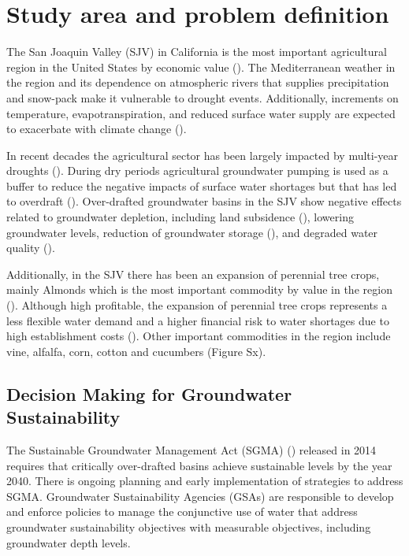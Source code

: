 \documentclass[11pt,a4paper]{article}
\begin{document}
\section{Study area and problem definition}

The San Joaquin Valley (SJV) in California is the most important agricultural region in the United States by economic value (\cite{usda_national_2020}). The Mediterranean weather in the region and its dependence on atmospheric rivers that supplies precipitation and snow-pack make it vulnerable to drought events. Additionally, increments on temperature, evapotranspiration, and reduced surface water supply are expected to exacerbate with climate change (\cite{fernandez-bou_regional_2021}).

 In recent decades the agricultural sector has been largely impacted by multi-year droughts (\cite{lund_lessons_2018,medellin-azuara_economic_2022}).  During dry periods agricultural groundwater pumping is used as a buffer to reduce the negative impacts of surface water shortages but that has led to overdraft (\cite{liu_groundwater_2022}). Over-drafted groundwater basins in the SJV show negative effects related to groundwater depletion, including land subsidence (\cite{ojha_sustained_2018}), lowering groundwater levels, reduction of groundwater storage (\cite{alam_post-drought_2021}), and degraded water quality (\cite{levy_critical_2021}).  
 
 Additionally, in the SJV there has been an expansion of perennial tree crops, mainly Almonds which is the most important commodity by value  in the region (\cite{usda_national_2020}). Although high profitable, the expansion of perennial tree crops represents a less flexible water demand and a higher financial risk to water shortages due to high establishment costs (\cite{qin_flexibility_2019,mall_water_2019}). Other important commodities in the region include vine, alfalfa, corn, cotton and cucumbers (Figure Sx). 

\subsection{Decision Making for Groundwater Sustainability}

 The Sustainable Groundwater Management Act (SGMA) (\cite{dwr_sustainable_2021}) released in 2014 requires that critically over-drafted basins achieve sustainable levels by the year 2040. There is ongoing planning and early implementation of strategies to address SGMA.  Groundwater Sustainability Agencies (GSAs) are responsible to develop and enforce policies to manage the conjunctive use of water that address groundwater sustainability objectives with measurable objectives, including groundwater depth levels.
 
\end{document}

